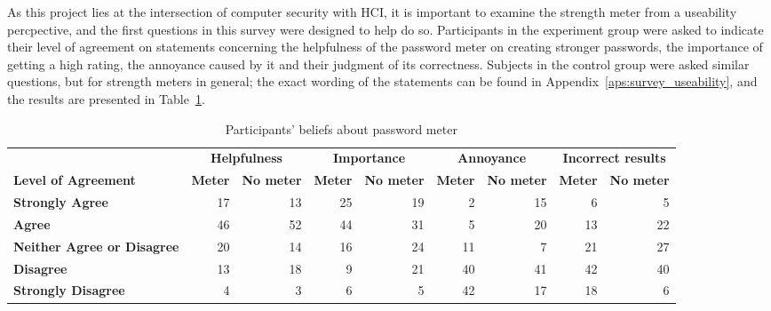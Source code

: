    As this project lies at the intersection of computer security with HCI, it is important to examine the strength meter from a useability percpective, and the first questions in this survey were designed to help do so. Participants in the experiment group were asked to indicate their level of agreement on statements concerning the helpfulness of the password meter on creating stronger passwords, the importance of getting a high rating, the annoyance caused by it and their judgment of its correctness. Subjects in the control group were asked similar questions, but for strength meters in general; the exact wording of the statements can be found in Appendix~\ref{aps:survey_useability}, and the results are presented in Table~\ref{tab:beliefs}.

    \begin{table}[htpb]
      \centering
      \scriptsize
      \hspace*{-2cm}
      \begin{tabular}{p{3cm} rrrrrrrr}
        \toprule
         & \multicolumn{2}{c}{\textbf{Helpfulness}} & \multicolumn{2}{c}{\textbf{Importance}} & \multicolumn{2}{c}{\textbf{Annoyance}} & \multicolumn{2}{c}{\textbf{Incorrect results}} \\
        \textbf{Level of Agreement} & \textbf{Meter} & \textbf{No meter} & \textbf{Meter} & \textbf{No meter} & \textbf{Meter} & \textbf{No meter} & \textbf{Meter} & \textbf{No meter} \\
        \midrule
         \textbf{Strongly Agree} & 17 & 13 & 25 & 19 & 2 & 15 & 6 & 5 \\
         \textbf{Agree} & 46 & 52 & 44 & 31 & 5 & 20 & 13 & 22 \\
         \textbf{Neither Agree \newline or Disagree} & 20 & 14 & 16 & 24 & 11 & 7 & 21 & 27 \\
         \textbf{Disagree} & 13 & 18 & 9 & 21 & 40 & 41 & 42 & 40 \\
         \textbf{Strongly Disagree} & 4 & 3 & 6 & 5 & 42 & 17 & 18 & 6\\
        \bottomrule
      \end{tabular}
      \caption{Participants' beliefs about password meter}
      \label{tab:beliefs}
    \end{table}

